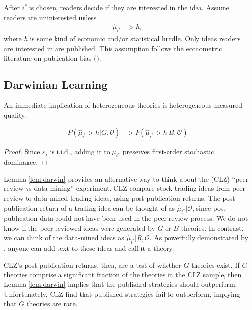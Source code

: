 \documentclass[12pt,english]{article}
\theoremstyle{plain}
\theoremstyle{plain}
\begin{document}
After $i^{\ast}$ is chosen, readers decide if they are interested in the idea. Assume readers are uninterested unless 
\begin{align}
\hat{\mu}_{i^{\ast}} & >h,
\end{align}
where $h$ is some kind of economic and/or statistical hurdle. Only ideas readers are interested in are published. This assumption follows the econometric literature on publication bias (\citet{andrews2019identification}).




 

\subsection{Darwinian Learning}

An immediate implication of heterogeneous theories is heterogeneous measured quality:
\begin{lemma}
    \label{lem:darwin}
    \begin{align}
        P\left(\hat{\mu}_{i^{\ast}}>h|G,\mathcal{O}\right) 
        &>
        P\left(\hat{\mu}_{i^{\ast}}>h|B,\mathcal{O}\right)
    \end{align}
\end{lemma}
\begin{proof}
    Since $\varepsilon_{i}$ is i.i.d., adding it to $\mu_{i^{\ast}}$ preserves first-order stochastic dominance.
\end{proof}

Lemma \ref{lem:darwin} provides an alternative way to think about the \citet{chen2022peer} (CLZ) ``peer review vs data mining'' experiment. CLZ compare stock trading ideas from peer review to data-mined trading ideas, using post-publication returns. The post-publication return of a trading idea can be thought of as $\hat{\mu}_{i^\ast}|\mathcal{O}$, since post-publication data could not have been used in the peer review process. We do not know if the peer-reviewed ideas were generated by $G$ or $B$ theories. In contrast, we can think of the data-mined ideas as $\hat{\mu}_{i^\ast}|B,\mathcal{O}$.  As powerfully demonstrated by \citet{novy2025ai}, anyone can add text to these ideas and call it a theory. 

CLZ's post-publication returns, then, are a test of whether $G$ theories exist. If $G$ theories comprise a significant fraction of the theories in the CLZ sample, then Lemma \ref{lem:darwin} implies that the published strategies should outperform. Unfortunately, CLZ find that published strategies fail to outperform, implying that $G$ theories are rare. 
\end{document}
